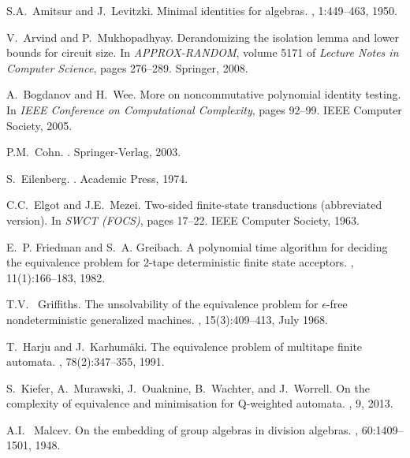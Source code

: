 \documentclass[runningheads]{llncs}
\begin{document}
\begin{thebibliography}{10}

S.A.~Amitsur and J.~Levitzki.
\newblock Minimal identities for algebras.
, 1:449--463,
  1950.

V.~Arvind and P.~Mukhopadhyay.
\newblock Derandomizing the isolation lemma and lower bounds for circuit size.
\newblock In {\em APPROX-RANDOM}, volume 5171 of {\em Lecture Notes in Computer
  Science}, pages 276--289. Springer, 2008.

A.~Bogdanov and H.~Wee.
\newblock More on noncommutative polynomial identity testing.
\newblock In {\em IEEE Conference on Computational Complexity}, pages 92--99.
  IEEE Computer Society, 2005.

P.M.~Cohn.
.
\newblock Springer-Verlag, 2003.

S.~Eilenberg.
.
\newblock Academic Press, 1974.

C.C.~Elgot and J.E.~Mezei.
\newblock Two-sided finite-state transductions (abbreviated version).
\newblock In {\em SWCT (FOCS)}, pages 17--22. IEEE Computer Society, 1963.

E.~P. Friedman and S.~A. Greibach.
\newblock A polynomial time algorithm for deciding the equivalence problem for
  2-tape deterministic finite state acceptors.
, 11(1):166--183, 1982.

T.V.~ Griffiths.
\newblock The unsolvability of the equivalence problem for $\epsilon$-free
  nondeterministic generalized machines.
, 15(3):409--413, July 1968.

T.~Harju and J.~Karhum{\"a}ki.
\newblock The equivalence problem of multitape finite automata.
, 78(2):347--355, 1991.

S.~Kiefer, A.~Murawski, J.~Ouaknine, B.~Wachter, and J.~Worrell.
\newblock On the complexity of equivalence and minimisation for {Q}-weighted
  automata.
, 9, 2013.

A.I.~ Malcev.
\newblock On the embedding of group algebras in division algebras.
, 60:1409--1501, 1948.


\end{thebibliography}
\end{document}
